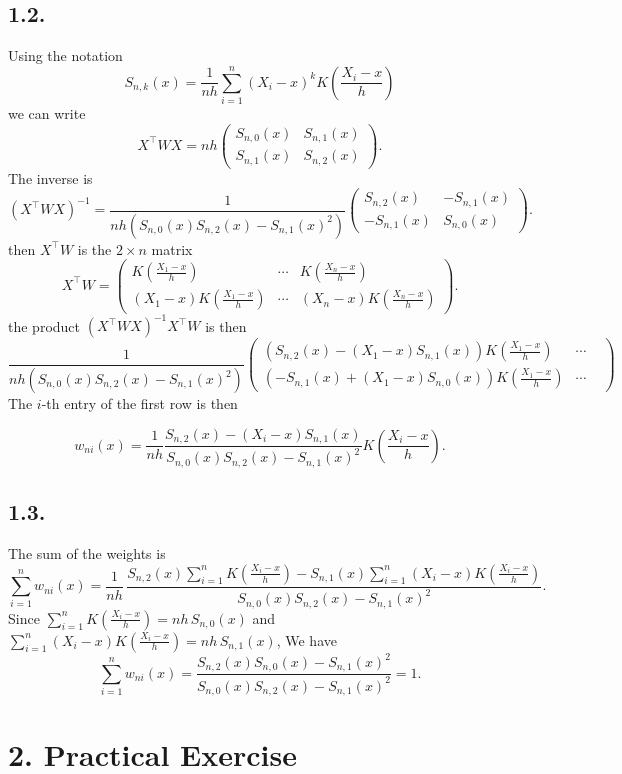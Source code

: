 \documentclass[11pt]{article}
\begin{document}
\subsection*{1.2.}
Using the notation
\[S_{n,k}(x) = \frac{1}{nh} \sum_{i=1}^n (X_i - x)^k K\left(\frac{X_i-x}{h}\right)\]
we can write 
\[X^{\top}WX = nh \begin{pmatrix}
S_{n,0}(x) & S_{n,1}(x)\\
S_{n,1}(x) & S_{n,2}(x)
\end{pmatrix}.\]
The inverse is
\[(X^{\top}WX)^{-1} = \frac{1}{nh(S_{n,0}(x)S_{n,2}(x)-S_{n,1}(x)^2)}
\begin{pmatrix}
S_{n,2}(x) & -S_{n,1}(x)\\
-S_{n,1}(x) & S_{n,0}(x)
\end{pmatrix}.\]
then 
\(X^{\top}W\) is the \(2\times n\) matrix
\[
X^{\top}W=
\begin{pmatrix}
K\left(\frac{X_1-x}{h}\right) & \cdots & K\left(\frac{X_n-x}{h}\right)\\
(X_1-x)K\left(\frac{X_1-x}{h}\right) & \cdots & (X_n-x)K\left(\frac{X_n-x}{h}\right)
\end{pmatrix}.
\]
the product \((X^{\top}WX)^{-1}X^{\top}W\) is then
\[
\frac{1}{nh(S_{n,0}(x)S_{n,2}(x)-S_{n,1}(x)^2)}
\begin{pmatrix}
(S_{n,2}(x) - (X_1 - x) S_{n,1}(x))K\left(\frac{X_1-x}{h}\right) & \cdots & \\
(-S_{n,1}(x) + (X_1 - x) S_{n,0}(x))K\left(\frac{X_1-x}{h}\right) & \cdots &
\end{pmatrix}
\]
The \(i\)-th entry of the first row is then

\[
w_{ni}(x) = \frac{1}{nh}\frac{S_{n,2}(x) - (X_i - x) S_{n,1}(x)}{S_{n,0}(x)S_{n,2}(x)-S_{n,1}(x)^2} K\left(\frac{X_i-x}{h}\right).
\]

\subsection*{1.3.}
The sum of the weights is
\[
\sum_{i=1}^n w_{ni}(x)
=\frac{1}{nh}\,
\frac{S_{n,2}(x)\sum_{i=1}^n K\left(\frac{X_i-x}{h}\right)
- S_{n,1}(x)\sum_{i=1}^n (X_i-x)K\left(\frac{X_i-x}{h}\right)}
{S_{n,0}(x)S_{n,2}(x)-S_{n,1}(x)^2}.
\]
Since \(\sum_{i=1}^n K\left(\frac{X_i-x}{h}\right)=nh\,S_{n,0}(x)\) and
\(\sum_{i=1}^n (X_i-x)K\left(\frac{X_i-x}{h}\right)=nh\,S_{n,1}(x)\),
We have 
\[\sum_{i=1}^n w_{ni}(x) =
\frac{S_{n,2}(x)S_{n,0}(x)-S_{n,1}(x)^2}
{S_{n,0}(x)S_{n,2}(x)-S_{n,1}(x)^2}=1.\]    

\section*{2. Practical Exercise}
\end{document}
